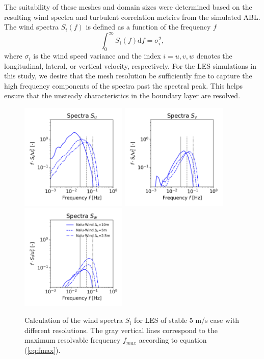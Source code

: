 The suitability of these meshes and domain sizes were determined based
on the resulting wind spectra and turbulent correlation metrics from
the simulated ABL. The wind spectra $S_i(f)$ is defined as a function
of the frequency $f$
\begin{equation}
  \int_0^\infty S_i(f) \textrm{d}f = \sigma_i^2,
\end{equation}
where $\sigma_i$ is the wind speed variance and the index $i=u,v,w$
denotes the longitudinal, lateral, or vertical velocity, respectively.
For the LES simulations in this study, we desire that the mesh
resolution be sufficiently fine to capture the high frequency
components of the spectra past the spectral peak.  This helps ensure
that the unsteady characteristics in the boundary layer are resolved.


\begin{figure}%
  \centering
  \includegraphics[width=2.0in]{figures/GridStudy_Spectra_Su.png}
  \includegraphics[width=2.0in]{figures/GridStudy_Spectra_Sv.png}
  \includegraphics[width=2.0in]{figures/GridStudy_Spectra_Sw.png}
  \caption{   \label{fig:GridStudySpectra}
    Calculation of the wind spectra $S_i$ for LES of stable
    5 m/s case with different resolutions.  The gray vertical lines
    correspond to the maximum resolvable frequency $f_{max}$ according
    to equation (\ref{eq:fmax}). }
\end{figure}

